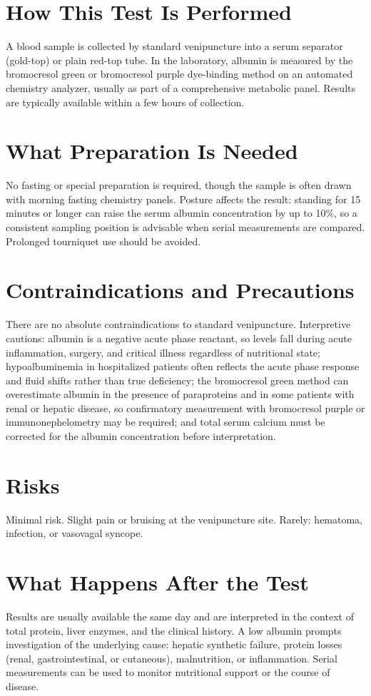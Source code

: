 \section*{How This Test Is Performed}
A blood sample is collected by standard venipuncture into a serum separator (gold-top) or plain red-top tube. In the laboratory, albumin is measured by the bromocresol green or bromocresol purple dye-binding method on an automated chemistry analyzer, usually as part of a comprehensive metabolic panel. Results are typically available within a few hours of collection.
\section*{What Preparation Is Needed}
No fasting or special preparation is required, though the sample is often drawn with morning fasting chemistry panels. Posture affects the result: standing for 15 minutes or longer can raise the serum albumin concentration by up to 10\%, so a consistent sampling position is advisable when serial measurements are compared. Prolonged tourniquet use should be avoided.
\section*{Contraindications and Precautions}
There are no absolute contraindications to standard venipuncture. Interpretive cautions: albumin is a negative acute phase reactant, so levels fall during acute inflammation, surgery, and critical illness regardless of nutritional state; hypoalbuminemia in hospitalized patients often reflects the acute phase response and fluid shifts rather than true deficiency; the bromocresol green method can overestimate albumin in the presence of paraproteins and in some patients with renal or hepatic disease, so confirmatory measurement with bromocresol purple or immunonephelometry may be required; and total serum calcium must be corrected for the albumin concentration before interpretation.
\section*{Risks}
Minimal risk. Slight pain or bruising at the venipuncture site. Rarely: hematoma, infection, or vasovagal syncope.
\section*{What Happens After the Test}
Results are usually available the same day and are interpreted in the context of total protein, liver enzymes, and the clinical history. A low albumin prompts investigation of the underlying cause: hepatic synthetic failure, protein losses (renal, gastrointestinal, or cutaneous), malnutrition, or inflammation. Serial measurements can be used to monitor nutritional support or the course of disease.

